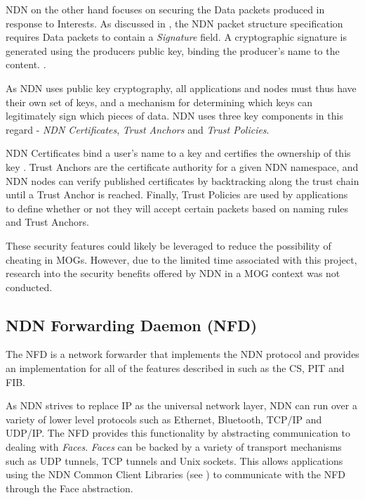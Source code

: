 NDN on the other hand focuses on securing the Data packets produced in response to Interests. As discussed in , the NDN packet structure specification requires Data packets to contain a \textit{Signature} field. A cryptographic signature is generated using the producers public key, binding the producer's name to the content. \cite{ndn-security-overview}.

As NDN uses public key cryptography, all applications and nodes must thus have their own set of keys, and a mechanism for determining which keys can legitimately sign which pieces of data. NDN uses three key components in this regard - \textit{NDN Certificates}, \textit{Trust Anchors} and \textit{Trust Policies}.

NDN Certificates bind a user's name to a key and certifies the ownership of this key \cite{ndn-security-overview}. Trust Anchors are the certificate authority for a given NDN namespace, and NDN nodes can verify published certificates by backtracking along the trust chain until a Trust Anchor is reached. Finally, Trust Policies are used by applications to define whether or not they will accept certain packets based on naming rules and Trust Anchors.

These security features could likely be leveraged to reduce the possibility of cheating in MOGs. However, due to the limited time associated with this project, research into the security benefits offered by NDN in a MOG context was not conducted. 








\subsection{NDN Forwarding Daemon (NFD)}
The NFD is a network forwarder that implements the NDN protocol \cite{nfd-github} and provides an implementation for all of the features described in  such as the CS, PIT and FIB. 

 As NDN strives to replace IP as the universal network layer, NDN can run over a variety of lower level protocols such as Ethernet, Bluetooth, TCP/IP and UDP/IP. The NFD provides this functionality by abstracting communication to dealing with \textit{Faces}. \textit{Faces} can be backed by a variety of transport mechanisms such as UDP tunnels, TCP tunnels and Unix sockets. This allows applications using the NDN Common Client Libraries (see ) to communicate with the NFD through the Face abstraction.

